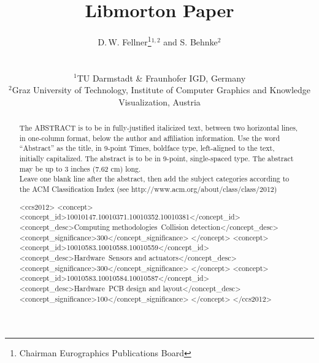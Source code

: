 \documentclass{egpubl}
\title[Libmorton paper]%
      {Libmorton Paper}
\author[D. Fellner \& S. Behnke]
{\parbox{\textwidth}{\centering D.\,W. Fellner\thanks{Chairman Eurographics Publications Board}$^{1,2}$
        and S. Behnke$^{2}$ 
        }
        \\
{\parbox{\textwidth}{\centering $^1$TU Darmstadt \& Fraunhofer IGD, Germany\\
         $^2$Graz University of Technology, Institute of Computer Graphics and Knowledge Visualization, Austria
       }
}
}
\begin{document}

\maketitle
\begin{abstract}
   The ABSTRACT is to be in fully-justified italicized text, 
   between two horizontal lines,
   in one-column format, 
   below the author and affiliation information. 
   Use the word ``Abstract'' as the title, in 9-point Times, boldface type, 
   left-aligned to the text, initially capitalized. 
   The abstract is to be in 9-point, single-spaced type.
   The abstract may be up to 3 inches (7.62 cm) long. \\
   Leave one blank line after the abstract, 
   then add the subject categories according to the ACM Classification Index 
   (see http://www.acm.org/about/class/class/2012)
\begin{CCSXML}
<ccs2012>
<concept>
<concept_id>10010147.10010371.10010352.10010381</concept_id>
<concept_desc>Computing methodologies~Collision detection</concept_desc>
<concept_significance>300</concept_significance>
</concept>
<concept>
<concept_id>10010583.10010588.10010559</concept_id>
<concept_desc>Hardware~Sensors and actuators</concept_desc>
<concept_significance>300</concept_significance>
</concept>
<concept>
<concept_id>10010583.10010584.10010587</concept_id>
<concept_desc>Hardware~PCB design and layout</concept_desc>
<concept_significance>100</concept_significance>
</concept>
</ccs2012>
\end{CCSXML}



\printccsdesc   
\end{abstract}  
\end{document}
